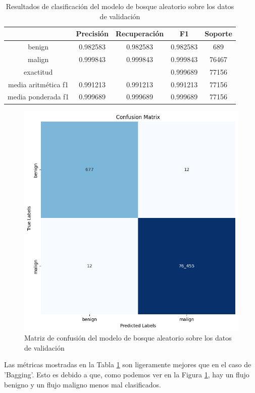 \begin{table}[H]
    \begin{center}
        \begin{tabular}{|c | c c c | c |} 
            \hline
            & \textbf{Precisión} & \textbf{Recuperación} & \textbf{F1}  & \textbf{Soporte} \\
            \hline
            benign               & 0.982583 & 0.982583 & 0.982583  &   689 \\
            malign               & 0.999843 & 0.999843 & 0.999843  & 76467 \\
            \hline
            exactitud            &          &          & 0.999689  & 77156 \\
            media aritmética f1  & 0.991213 & 0.991213 & 0.991213  & 77156 \\
            media ponderada f1   & 0.999689 & 0.999689 & 0.999689  & 77156 \\
            \hline
        \end{tabular}
    \end{center}
    \caption{Resultados de clasificación del modelo de bosque aleatorio sobre los datos de validación}
    \label{table:randomforestresults}
\end{table}

\begin{figure}[H]
    \begin{center}
        \includegraphics[width=0.55\linewidth]{media/packet_pincer_train_models_random_forest.png}
    \end{center}
    \caption{Matriz de confusión del modelo de bosque aleatorio sobre los datos de validación}\label{fig:randomforestmatrix}
\end{figure}

Las métricas mostradas en la Tabla \ref{table:randomforestresults} son ligeramente mejores que en el caso de 'Bagging'. Esto es debido a que, como podemos ver en la Figura \ref{fig:randomforestmatrix}, hay un flujo benigno y un flujo maligno menos mal clasificados.

